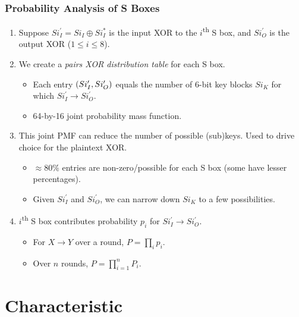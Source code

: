 \documentclass{beamer}
\begin{document}
	\begin{frame}
		\frametitle{Probability Analysis of S Boxes}
		\begin{enumerate}
			\item Suppose \(Si_I^\prime = Si_I \oplus Si_I^*\) is the input XOR
			to the \(i\)\textsuperscript{th} S box, and \(Si_O^\prime\) is the
			output XOR (\(1 \le i \le 8\)).
			\item<2-> We create a \emph{pairs XOR distribution table} for each S
			box.
			\begin{itemize}
				\item Each entry \((Si_I^\prime, Si_O^\prime)\) equals the
				number of 6-bit key blocks \(Si_K\) for which \(Si_I^\prime
				\rightarrow Si_O^\prime\).
				\item 64-by-16 joint probability mass function.
			\end{itemize}
			\item<3-> This joint PMF can reduce the number of possible
			(sub)keys. Used to drive choice for the plaintext XOR.
			\begin{itemize}
				\item \(\approx 80\%\) entries are non-zero/possible for each S
				box (some have lesser percentages).
				\item Given \(Si_I^\prime\) and \(Si_O^\prime\), we can narrow
				down \(Si_K\) to a few possibilities.
			\end{itemize}
			\item<4-> \(i\)\textsuperscript{th} S box contributes probability
			\(p_i\) for \(Si_I^\prime \rightarrow Si_O^\prime\). 
			\begin{itemize}
				\item For \(X \rightarrow Y\) over a round, \(P = \prod_i p_i\).
				\item Over \(n\) rounds, \(P = \prod_{i=1}^n P_i\).
			\end{itemize}
		\end{enumerate}
	\end{frame}

	\section{Characteristic}
\end{document}
